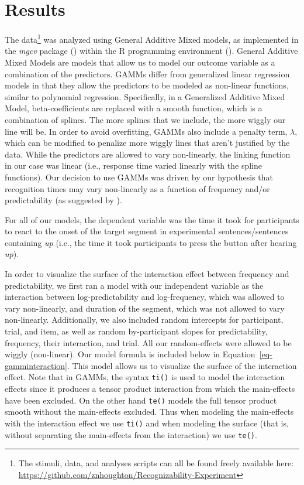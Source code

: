 \documentclass[
  12pt,
  letterpaper,
]{scrreprt}
\begin{document}
\section{Results}\label{results-4}

The data\footnote{The stimuli, data, and analyses scripts can all be
  found freely available here:
  \url{https://github.com/znhoughton/Recognizability-Experiment}} was
analyzed using General Additive Mixed models, as implemented in the
\emph{mgcv} package () within the
R programming environment ().
General Additive Mixed Models are models that allow us to model our
outcome variable as a combination of the predictors. GAMMs differ from
generalized linear regression models in that they allow the predictors
to be modeled as non-linear functions, similar to polynomial regression.
Specifically, in a Generalized Additive Mixed Model, beta-coefficients
are replaced with a smooth function, which is a combination of splines.
The more splines that we include, the more wiggly our line will be. In
order to avoid overfitting, GAMMs also include a penalty term,
\(\lambda\), which can be modified to penalize more wiggly lines that
aren't justified by the data. While the predictors are allowed to vary
non-linearly, the linking function in our case was linear (i.e.,
response time varied linearly with the spline functions). Our decision
to use GAMMs was driven by our hypothesis that recognition times may
vary non-linearly as a function of frequency and/or predictability (as
suggested by
).

For all of our models, the dependent variable was the time it took for
participants to react to the onset of the target segment in experimental
sentences/sentences containing \emph{up} (i.e., the time it took
participants to press the button after hearing \emph{up}).

In order to visualize the surface of the interaction effect between
frequency and predictability, we first ran a model with our independent
variable as the interaction between log-predictability and
log-frequency, which was allowed to vary non-linearly, and duration of
the segment, which was not allowed to vary non-linearly. Additionally,
we also included random intercepts for participant, trial, and item, as
well as random by-participant slopes for predictability, frequency,
their interaction, and trial. All our random-effects were allowed to be
wiggly (non-linear). Our model formula is included below in
Equation~\ref{eq-gamminteraction}. This model allows us to visualize the
surface of the interaction effect. Note that in GAMMs, the syntax
\texttt{ti()} is used to model the interaction effects since it produces
a tensor product interaction from which the main-effects have been
excluded. On the other hand \texttt{te()} models the full tensor product
smooth without the main-effects excluded. Thus when modeling the
main-effects with the interaction effect we use \texttt{ti()} and when
modeling the surface (that is, without separating the main-effects from
the interaction) we use \texttt{te()}.
\end{document}
